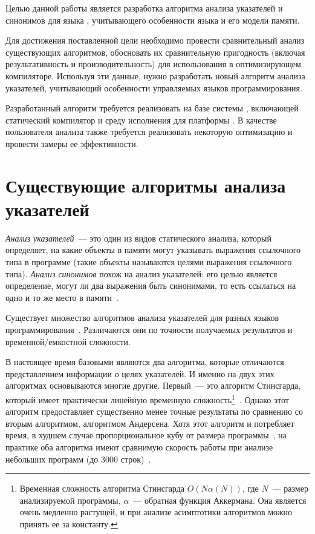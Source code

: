 \documentclass[14pt,titlepage,draft]{extarticle}
\newcommand{\java}{\eng{Java}\xspace}
\begin{document}
    Целью данной работы является разработка алгоритма анализа указателей и
    синонимов для языка \java, учитывающего особенности языка и его модели
    памяти.

    Для достижения поставленной цели необходимо провести сравнительный анализ
    существующих алгоритмов, обосновать их сравнительную пригодность (включая
    результативность и производительность) для использования в оптимизирующем
    компиляторе. Используя эти данные, нужно разработать новый алгоритм анализа
    указателей, учитывающий особенности управляемых языков программирования.

    Разработанный алгоритм требуется реализовать на базе системы , включающей статический компилятор и среду
    исполнения для платформы . В качестве пользователя анализа
    также требуется реализовать некоторую оптимизацию и провести замеры ее
    эффективности.

  \section{Существующие алгоритмы анализа указателей}

    \emph{Анализ указателей}~--- это один из видов статического анализа,
    который определяет, на какие объекты в памяти могут указывать выражения
    ссылочного типа в программе (такие объекты называются целями выражения
    ссылочного типа). \emph{Анализ синонимов} похож на анализ указателей: его
    целью является определение, могут ли два выражения быть синонимами, то есть
    ссылаться на одно и то же место в памяти~\cite{andersen}.

    Существует множество алгоритмов анализа указателей для разных языков
    программирования~\cite{hind_pointer_analysis_not_solved_yet}. Различаются
    они по точности получаемых результатов и временной\slash{}емкостной
    сложности.

    В настоящее время базовыми являются два алгоритма, которые отличаются
    представлением информации о целях указателей. И именно на двух этих
    алгоритмах основываются многие другие.
    Первый~--- это алгоритм Стинсгарда, который имеет
    практически линейную временную сложность\footnote{
      Временная сложность алгоритма Стинсгарда
      $O(N \alpha(N))$, где $N$~--- размер анализируемой программы,
      $\alpha$~--- обратная функция Аккермана. Она является очень медленно
      растущей, и при анализе асимптотики алгоритмов можно принять ее за
      константу.
    }~\cite{steensgaard}. Однако этот алгоритм предоставляет существенно менее
    точные результаты по сравнению со вторым алгоритмом, алгоритмом
    Андерсена. Хотя этот алгоритм и потребляет время, в худшем случае
    пропорциональное кубу от размера программы~\cite{andersen}, на практике оба
    алгоритма имеют сравнимую скорость работы при анализе небольших программ
    (до \num{3000} строк)~\cite{shapiro_fast_and_accurate}.
\end{document}
